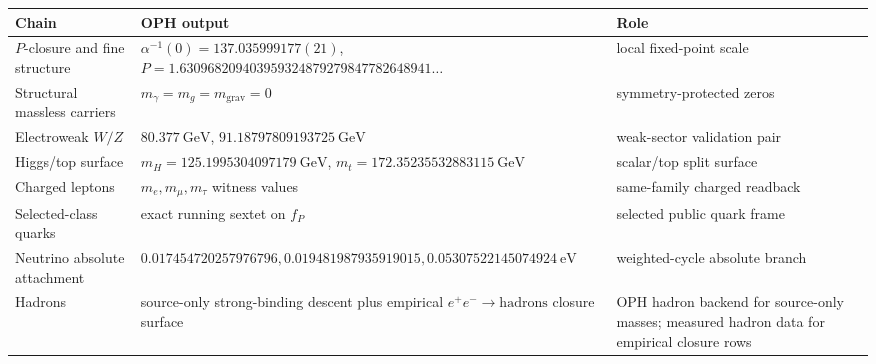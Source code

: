 \documentclass[11pt]{article}
\begin{document}
\begin{table}[h]
\centering
\scriptsize
\setlength{\tabcolsep}{3pt}
\begin{tabular}{@{}>{\raggedright\arraybackslash}p{}>{\raggedright\arraybackslash}p{}>{\raggedright\arraybackslash}p{}@{}}
\toprule
Chain & OPH output & Role \\
\midrule
\(P\)-closure and fine structure & \(\alpha^{-1}(0)=137.035999177(21)\), \(P=1.630968209403959324879279847782648941\ldots\) & local fixed-point scale \\
Structural massless carriers & \(m_\gamma=m_g=m_{\mathrm{grav}}=0\) & symmetry-protected zeros \\
Electroweak \(W/Z\) & \(80.377~\mathrm{GeV}\), \(91.18797809193725~\mathrm{GeV}\) & weak-sector validation pair \\
Higgs/top surface & \(m_H=125.1995304097179~\mathrm{GeV}\), \(m_t=172.35235532883115~\mathrm{GeV}\) & scalar/top split surface \\
Charged leptons & \(m_e,m_\mu,m_\tau\) witness values & same-family charged readback \\
Selected-class quarks & exact running sextet on \(f_P\) & selected public quark frame \\
Neutrino absolute attachment & \(0.017454720257976796,0.019481987935919015,0.05307522145074924~\mathrm{eV}\) & weighted-cycle absolute branch \\
Hadrons & source-only strong-binding descent plus empirical \(e^+e^-\to\mathrm{hadrons}\) closure surface & OPH hadron backend for source-only masses; measured hadron data for empirical closure rows \\
\bottomrule
\end{tabular}
\end{table}
\end{document}
